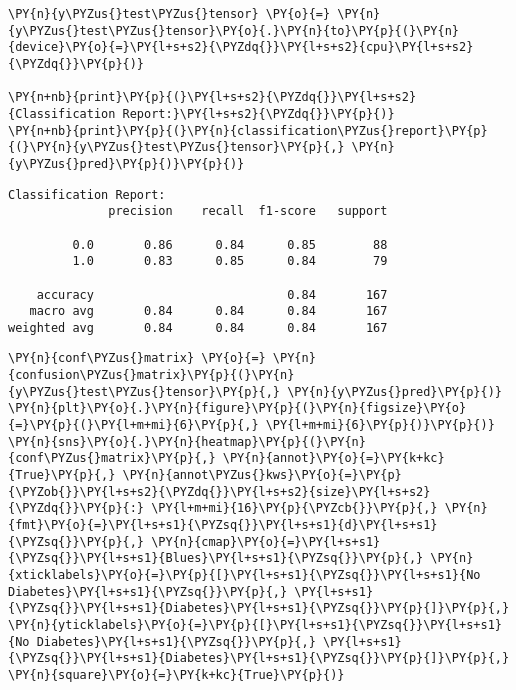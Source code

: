     \begin{tcolorbox}[breakable, size=fbox, boxrule=1pt, pad at break*=1mm,colback=cellbackground, colframe=cellborder]
\begin{Verbatim}[commandchars=\\\{\}]
\PY{n}{y\PYZus{}test\PYZus{}tensor} \PY{o}{=} \PY{n}{y\PYZus{}test\PYZus{}tensor}\PY{o}{.}\PY{n}{to}\PY{p}{(}\PY{n}{device}\PY{o}{=}\PY{l+s+s2}{\PYZdq{}}\PY{l+s+s2}{cpu}\PY{l+s+s2}{\PYZdq{}}\PY{p}{)}

\PY{n+nb}{print}\PY{p}{(}\PY{l+s+s2}{\PYZdq{}}\PY{l+s+s2}{Classification Report:}\PY{l+s+s2}{\PYZdq{}}\PY{p}{)}
\PY{n+nb}{print}\PY{p}{(}\PY{n}{classification\PYZus{}report}\PY{p}{(}\PY{n}{y\PYZus{}test\PYZus{}tensor}\PY{p}{,} \PY{n}{y\PYZus{}pred}\PY{p}{)}\PY{p}{)}
\end{Verbatim}
\end{tcolorbox}

    \begin{Verbatim}[commandchars=\\\{\}]
Classification Report:
              precision    recall  f1-score   support

         0.0       0.86      0.84      0.85        88
         1.0       0.83      0.85      0.84        79

    accuracy                           0.84       167
   macro avg       0.84      0.84      0.84       167
weighted avg       0.84      0.84      0.84       167

    \end{Verbatim}

    \begin{tcolorbox}[breakable, size=fbox, boxrule=1pt, pad at break*=1mm,colback=cellbackground, colframe=cellborder]
\begin{Verbatim}[commandchars=\\\{\}]
\PY{n}{conf\PYZus{}matrix} \PY{o}{=} \PY{n}{confusion\PYZus{}matrix}\PY{p}{(}\PY{n}{y\PYZus{}test\PYZus{}tensor}\PY{p}{,} \PY{n}{y\PYZus{}pred}\PY{p}{)}
\PY{n}{plt}\PY{o}{.}\PY{n}{figure}\PY{p}{(}\PY{n}{figsize}\PY{o}{=}\PY{p}{(}\PY{l+m+mi}{6}\PY{p}{,} \PY{l+m+mi}{6}\PY{p}{)}\PY{p}{)}
\PY{n}{sns}\PY{o}{.}\PY{n}{heatmap}\PY{p}{(}\PY{n}{conf\PYZus{}matrix}\PY{p}{,} \PY{n}{annot}\PY{o}{=}\PY{k+kc}{True}\PY{p}{,} \PY{n}{annot\PYZus{}kws}\PY{o}{=}\PY{p}{\PYZob{}}\PY{l+s+s2}{\PYZdq{}}\PY{l+s+s2}{size}\PY{l+s+s2}{\PYZdq{}}\PY{p}{:} \PY{l+m+mi}{16}\PY{p}{\PYZcb{}}\PY{p}{,} \PY{n}{fmt}\PY{o}{=}\PY{l+s+s1}{\PYZsq{}}\PY{l+s+s1}{d}\PY{l+s+s1}{\PYZsq{}}\PY{p}{,} \PY{n}{cmap}\PY{o}{=}\PY{l+s+s1}{\PYZsq{}}\PY{l+s+s1}{Blues}\PY{l+s+s1}{\PYZsq{}}\PY{p}{,} \PY{n}{xticklabels}\PY{o}{=}\PY{p}{[}\PY{l+s+s1}{\PYZsq{}}\PY{l+s+s1}{No Diabetes}\PY{l+s+s1}{\PYZsq{}}\PY{p}{,} \PY{l+s+s1}{\PYZsq{}}\PY{l+s+s1}{Diabetes}\PY{l+s+s1}{\PYZsq{}}\PY{p}{]}\PY{p}{,} \PY{n}{yticklabels}\PY{o}{=}\PY{p}{[}\PY{l+s+s1}{\PYZsq{}}\PY{l+s+s1}{No Diabetes}\PY{l+s+s1}{\PYZsq{}}\PY{p}{,} \PY{l+s+s1}{\PYZsq{}}\PY{l+s+s1}{Diabetes}\PY{l+s+s1}{\PYZsq{}}\PY{p}{]}\PY{p}{,} \PY{n}{square}\PY{o}{=}\PY{k+kc}{True}\PY{p}{)}
\end{Verbatim}
\end{tcolorbox}

